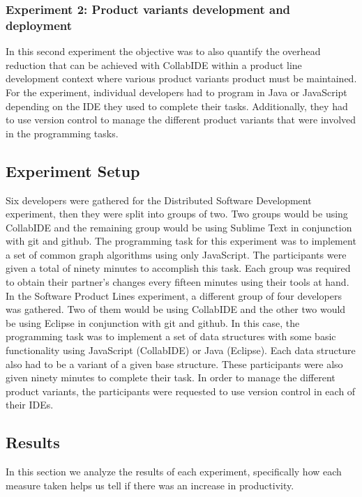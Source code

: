 \subsubsection{Experiment 2: Product variants development and deployment}
In this second experiment the objective was to also quantify the overhead reduction that can be achieved with CollabIDE within a product line development context where various product variants product must be maintained.
For the experiment, individual developers had to program in Java or JavaScript depending on the IDE they used to complete their tasks. Additionally, they had to use version control to manage the different product variants that were involved in the programming tasks.

\subsection{Experiment Setup}

Six developers were gathered for the Distributed Software Development experiment, then they were split into groups of two. Two groups would be using CollabIDE and the remaining group would be using Sublime Text in conjunction with git and github. The programming task for this experiment was to implement a set of common graph algorithms using only JavaScript. The participants were given a total of ninety minutes to accomplish this task. Each group was required to obtain their partner’s changes every fifteen minutes using their tools at hand.
In the Software Product Lines experiment, a different group of four developers was gathered. Two of them would be using CollabIDE and the other two would be using Eclipse in conjunction with git and github. In this case, the programming task was to implement a set of data structures with some basic functionality using JavaScript (CollabIDE) or Java (Eclipse). Each data structure also had to be a variant of a given base structure. These participants were also given ninety minutes to complete their task. In order to manage the different product variants, the participants were requested to use version control in each of their IDEs.


	

\subsection{Results}

In this section we analyze the results of each experiment, specifically how each measure taken helps us tell if there was an increase in productivity.

